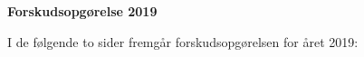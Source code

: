 \documentclass[../Ansoegning.tex]{subfiles}
\begin{document}
\begin{center}
    \Large{\textbf{Forskudsopgørelse 2019}}\vspace{-0.7cm}
\end{center}

I de følgende to sider fremgår forskudsopgørelsen for året 2019:

\begin{minipage}{1\textwidth}

\end{minipage}
    \newpage
    
\begin{minipage}{1.0\textwidth}

\end{minipage}
    \newpage
\end{document}
